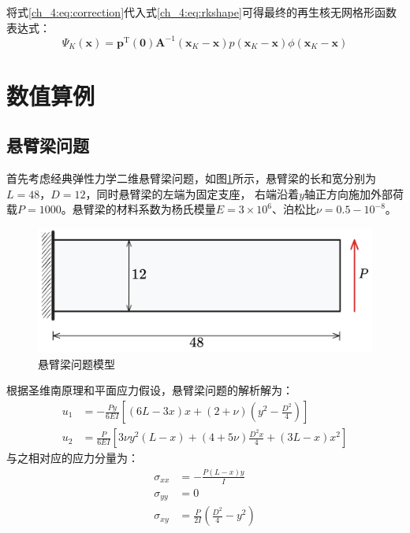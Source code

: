 将式\eqref{ch_4:eq:correction}代入式\eqref{ch_4:eq:rkshape}可得最终的再生核无网格形函数表达式：
\begin{equation}\label{ch_4:eq:mfshapefunction}
    \Psi_K(\boldsymbol x) = \boldsymbol p^{\mathrm{T}}(\boldsymbol 0) \boldsymbol A^{-1}(\boldsymbol x_K-\boldsymbol x)p(\boldsymbol x_K-\boldsymbol x)\phi(\boldsymbol x_K-\boldsymbol x)
\end{equation}

\section{数值算例}
\subsection{悬臂梁问题}

首先考虑经典弹性力学二维悬臂梁问题，如图\ref{ch_4:fig:cantilever}所示，悬臂梁的长和宽分别为$L=48$，$D=12$，同时悬臂梁的左端为固定支座，
右端沿着$y$轴正方向施加外部荷载$P=1000$。悬臂梁的材料系数为杨氏模量$E=3\times10^6$、泊松比$\nu=0.5-10^{-8}$。
\begin{figure}[!h]
    \centering 
        \includegraphics[scale=0.5]{figures/ch_4/cantilever.png}
        \caption{悬臂梁问题模型}\label{ch_4:fig:cantilever}
\end{figure}

根据圣维南原理和平面应力假设，悬臂梁问题的解析解为：
\begin{equation}
    \begin{split}
        u_1 &= -\frac{Py}{6EI}[(6L-3x)x + (2+\nu)(y^2 - \frac{D^2}{4})] \\
        u_2 &= \frac{P}{6EI}[3\nu y^2(L-x) + (4+5\nu)\frac{D^2x}{4} + (3L-x)x^2]
    \end{split}
\end{equation}
与之相对应的应力分量为：
\begin{equation}
\begin{split}
   \sigma_{xx}&=-\frac{P(L-x)y}{I}\\
   \sigma_{yy}&=0\\
   \sigma_{xy}&=\frac{P}{2I}(\frac{D^2}{4}-y^2)
\end{split}
\end{equation}


